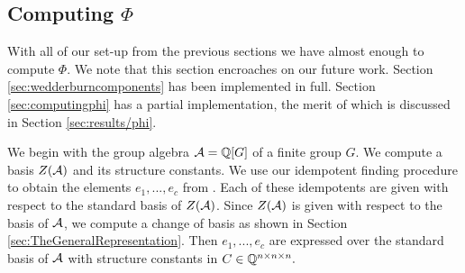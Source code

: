 \documentclass[../thesis.tex]{subfiles}
\begin{document}
\subsection{Computing $\Phi$}
With all of our set-up from the previous sections we have almost enough to compute $\Phi.$ We note that this section encroaches on our future work. Section \ref{sec:wedderburncomponents} has been implemented in full. Section \ref{sec:computingphi} has a partial implementation, the merit of which is discussed in Section \ref{sec:results/phi}.

We begin with the group algebra $\mathcal{A} = \mathbb{Q}[G]$ of a finite group $G.$ We compute a basis $Z(\mathcal{A})$ and its structure constants. We use our idempotent finding procedure to obtain the elements $e_1,...,e_c$ from . Each of these idempotents are given with respect to the standard basis of $Z(\mathcal{A})$. Since $Z(\mathcal{A})$ is given with respect to the basis of $\mathcal{A}$, we compute a change of basis as shown in Section \ref{sec:TheGeneralRepresentation}. Then $e_1,...,e_c$ are expressed over the standard basis of $\mathcal{A}$ with structure constants in $C\in\mathbb{Q}^{n\times n\times n}.$
\end{document}
